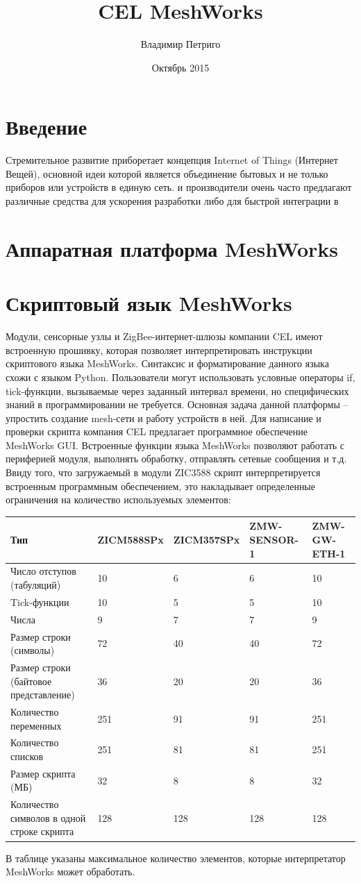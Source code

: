 \documentclass[12pt]{article}
\title{CEL MeshWorks}
\author{Владимир Петриго}
\date{Октябрь 2015}
\begin{document}
\maketitle

\section{Введение}

Стремительное развитие приборетает концепция Internet of Things (Интернет Вещей),
основной идеи которой является объединение бытовых и не только приборов или 
устройств в единую сеть. и производители очень часто предлагают различные 
средства для ускорения разработки либо для быстрой интеграции в 
\section{Аппаратная платформа MeshWorks}
\section{Скриптовый язык MeshWorks}

Модули, сенсорные узлы и ZigBee-интернет-шлюзы компании CEL имеют встроенную 
прошивку, которая позволяет интерпретировать инструкции скриптового языка 
MeshWorks. Синтаксис и форматирование данного языка схожи с языком Python. 
Пользователи могут использовать условные операторы if, tick-функции, вызываемые 
через заданный интервал времени, но специфических знаний в программировании не 
требуется. Основная задача данной платформы – упростить создание mesh-сети и 
работу устройств в ней.
Для написание и проверки скрипта компания CEL предлагает программное обеспечение 
MeshWorks GUI. Встроенные функции языка MeshWorks позволяют работать с периферией 
модуля, выполнять обработку, отправлять сетевые сообщения и т.д.
Ввиду того, что загружаемый в модули ZIC3588 скрипт интерпретируется встроенным 
программным обеспечением, это накладывает определенные ограничения на количество 
используемых элементов:
\begin{center}
\begin{tabular}{ |p{3cm}|p{2cm}|p{2cm}|p{2cm}|p{2cm}| } 
 \hline
 Тип & ZICM588SPx & ZICM357SPx & ZMW-SENSOR-1 & ZMW-GW-ETH-1 \\
 \hline
 Число отступов (табуляций) & 10 & 6 & 6 & 10 \\ 
 Tick-функции & 10 & 5 & 5 & 10 \\ 
 Числа & 9 & 7 & 7 & 9 \\ 
 Размер строки (символы) & 72 & 40 & 40 & 72 \\
 Размер строки (байтовое представление) & 36 & 20 & 20 & 36 \\
 Количество переменных & 251 & 91 & 91 & 251 \\
 Количество списков & 251 & 81 & 81 & 251 \\
 Размер скрипта (МБ) & 32 & 8 & 8 & 32 \\
 Количество символов в одной строке скрипта & 128 & 128 & 128 & 128 \\
 \hline
\end{tabular}
\end{center}
В таблице указаны максимальное количество элементов, которые интерпретатор MeshWorks может обработать.
\end{document}
